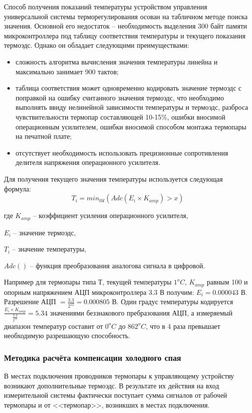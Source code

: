 Способ получения показаний температуры устройством управления универсальной
системы терморегулирования осован на табличном методе поиска значения.
Основной его недостаток -- необходимость выделения 300 байт памяти микроконтроллера под
таблицу соответствия температуры и текущего показания термоэдс.
Однако он обладает следующими преимуществами:
\begin{itemize}
	\item{} сложность алгоритма вычисления значения температуры линейна и максимально занимает
		900 тактов;
	\item{} таблица соответствия может одновременно кодировать значение термоэдс с поправкой на
		ошибку считанного значения термоэдс, что необходимо выполнять ввиду нелинейной зависимости
		температуры и термоэдс, разброса чувствительности термопар составляющей 10-15\%, ошибки
		вносимой операционным усилителем, ошибки вносимой способом монтажа термопары на печатной плате;
	\item{} отсутствует необходимость использовать прецизионные сопротивления делителя
		напряжения операционного усилителя.
\end{itemize}

Для получения текущего значения температуры используется следующая формула:
\begin{equation}
	T_i = min_{tbl}(Adc(E_i \times{} K_{amp}) > x) 
\end{equation}
\begin{ESKDexplanation}
	\item[где ]{} $K_{amp}$ -- коэффициент усиления операционного усилителя,
	\item{} $E_i$ -- значение термоэдс,
	\item{} $T_i$ -- значение температуры,
	\item{} $Adc()$ -- функция преобразования аналогова сигнала в цифровой.
\end{ESKDexplanation}


Например для термопары типа Т, текущей температуры $1^oC$, $K_{amp}$ равным 100 и опорным напряжением
АЦП микроконтроллера 3.3 В получим:
$E_i = 0.000043$ В. Разрешение АЦП $= \frac{3.3}{2^{12}} = 0.000805$ В. Один градус температуры
кодируется $\frac{E_i \times{} K_{amp}}{\frac{3.3}{2^{12}}} = 5.34 $ значениями
беззнакового пребразования АЦП, а измеряемый диапазон температур составит от $0^oC$ до $862^oC$,
что в 4 раза превышает необходимую разрешающую способность.

\subsubsection{Методика расчёта компенсации холодного спая}
В местах подключения проводников термопары к управляющему устройству возникают дополнительные термоэдс.
В результате их действия на вход измерительной системы фактически поступает сумма сигналов от рабочей
термопары и от <<термопар>>, возникших в местах подключения.


